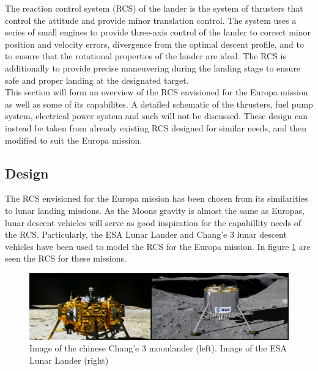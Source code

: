 \label{chap:RCS}

The reaction control system (RCS) of the lander is the system of thrusters that control the attitude and provide minor translation control. The system uses a series of small engines to provide three-axis control of the lander to correct minor position and velocity errors, divergence from the optimal descent profile, and to to ensure that the rotational properties of the lander are ideal. The RCS is additionally to provide precise maneuvering during the landing stage to ensure safe and proper landing at the designated target.\\

This section will form an overview of the RCS envisioned for the Europa mission as well as some of its capabilites. A detailed schematic of the thrusters, fuel pump system, electrical power system and such will not be discussed. These design can instead be taken from already existing RCS designed for similar needs, and then modified to suit the Europa mission.

\subsection{Design}

The RCS envisioned for the Europa mission has been chosen from its similarities to lunar landing missions. As the Moons gravity is almost the same as Europas, lunar descent vehicles  will serve as good inspiration for the capabillity needs of the RCS. Particularly, the ESA Lunar Lander and Chang'e 3 lunar descent vehicles have been used to model the RCS for the Europa mission. In figure \ref{fig:landers} are seen the RCS for these missions.\\


\begin{figure}[htb]
\begin{center}
\includegraphics[scale=0.19]{figures/RCS/landers}
\caption{Image of the chinese Chang'e 3 moonlander (left). Image of the ESA Lunar Lander (right)}
\label{fig:landers}
\end{center}
\end{figure}


